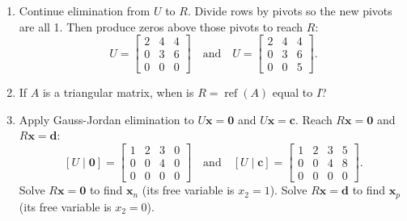 \documentclass[14pt, a4paper]{article}
\begin{document}
\begin{enumerate}[resume]
    \item Continue elimination from $U$ to $R$. Divide rows by pivots so the new pivots are all 1. Then produce zeros above those pivots to reach $R$:
          \[
              U = \begin{bmatrix}
                  2 & 4 & 4 \\
                  0 & 3 & 6 \\
                  0 & 0 & 0
              \end{bmatrix}
              \quad \text{and} \quad
              U = \begin{bmatrix}
                  2 & 4 & 4 \\
                  0 & 3 & 6 \\
                  0 & 0 & 5
              \end{bmatrix}.
          \]

    \item If $A$ is a triangular matrix, when is $R = \operatorname{ref}(A)$ equal to $I$?

    \item Apply Gauss-Jordan elimination to $U\mathbf{x} = \mathbf{0}$ and $U\mathbf{x} = \mathbf{c}$. Reach $R\mathbf{x} = \mathbf{0}$ and $R\mathbf{x} = \mathbf{d}$:
          \[
              [U \mid \mathbf{0}] = \begin{bmatrix}
                  1 & 2 & 3 & 0 \\
                  0 & 0 & 4 & 0 \\
                  0 & 0 & 0 & 0
              \end{bmatrix}
              \quad \text{and} \quad
              [U \mid \mathbf{c}] = \begin{bmatrix}
                  1 & 2 & 3 & 5 \\
                  0 & 0 & 4 & 8 \\
                  0 & 0 & 0 & 0
              \end{bmatrix}.
          \]
          Solve $R\mathbf{x} = \mathbf{0}$ to find $\mathbf{x}_n$ (its free variable is $x_2 = 1$). Solve $R\mathbf{x} = \mathbf{d}$ to find $\mathbf{x}_p$ (its free variable is $x_2 = 0$).


\end{enumerate}
\end{document}
